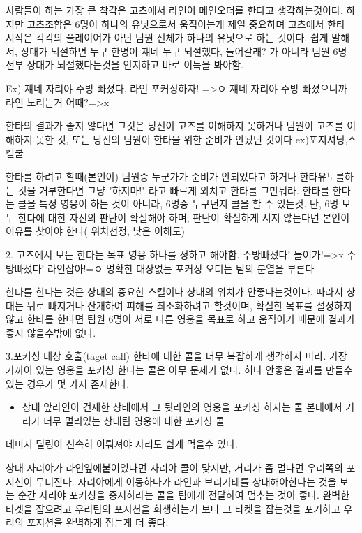  사람들이 하는 가장 큰 착각은 고츠에서 라인이 메인오더를 한다고 생각하는것이다.
하지만 고츠조합은 6명이 하나의 유닛으로서 움직이는게 제일 중요하며 고츠에서 한타 시작은 각각의 플레이어가 아닌 팀원 전체가 하나의 유닛으로 하는 것이다.
쉽게 말해서, 상대가 뇌절하면 누구 한명이 쟤네 누구 뇌절했다, 들어갈래? 가 아니라 팀원 6명 전부 상대가 뇌절했다는것을 인지하고 바로 이득을 봐야함.

Ex) 쟤네 자리야 주방 빠졌다, 라인 포커싱하자! =>ㅇ
     쟤네 자리야 주방 빠졌으니까 라인 노리는거 어때?=>x

 한타의 결과가 좋지 않다면 그것은 당신이 고츠를 이해하지 못하거나 팀원이 고츠를 이해하지 못한 것, 또는 당신의 팀원이 한타을 위한 준비가 안됬던 것이다 ex)포지셔닝,스킬쿨

 한타를 하려고 할때(본인이) 팀원중 누군가가 준비가 안되었다고 하거나 한타유도를하는 것을 거부한다면 그냥 "하지마!" 라고 빠르게 외치고 한타를 그만둬라.
한타를 한다는 콜을 특정 영웅이 하는 것이 아니라, 6명중 누구던지 콜을 할 수 있는것.
단, 6명 모두 한타에 대한 자신의 판단이 확실해야 하며, 판단이 확실하게 서지 않는다면 본인이 이유를 찾아야 한다( 위치선정, 낮은 이해도)

2. 고츠에서 모든 한타는 목표 영웅 하나를 정하고 해야함.
            주방빠졌다! 들어가!=>x
            주방빠졌다! 라인잡아!=ㅇ
명확한 대상없는 포커싱 오더는 팀의 분열을 부른다

 한타를 한다는 것은 상대의 중요한 스킬이나 상대의 위치가 안좋다는것이다. 
따라서 상대는 뒤로 빠지거나 산개하여 피해를 최소화하려고 할것이며,
확실한 목표를 설정하지 않고 한타를 한다면 팀원 6명이 서로 다른 영웅을 목표로 하고 움직이기 때문에 결과가 좋지 않을수밖에 없다.

3.포커싱 대상 호출(taget call)
 한타에 대한 콜을 너무 복잡하게 생각하지 마라.
가장 가까이 있는 영웅을 포커싱 한다는 콜은 아무 문제가 없다.  
허나 안좋은 결과를 만들수 있는 경우가 몇 가지 존재한다.
\begin{itemize}
    \item 상대 앞라인이 건재한 상태에서 그 뒷라인의 영웅을 포커싱 하자는 콜
     본대에서 거리가 너무 멀리있는 상대팀 영웅에 대한 포커싱 콜
\end{itemize}
데미지 딜링이 신속히 이뤄져야 자리도 쉽게 먹을수 있다.

상대 자리야가 라인옆에붙어있다면 자리야 콜이 맞지만, 거리가 좀 멀다면 우리쪽의 포지션이 무너진다.
자리야에게 이동하다가 라인과 브리기테를 상대해야한다는 것을 보는 순간 자리야 포커싱을 중지하라는 콜을 팀에게 전달하여 멈추는 것이 좋다.
완벽한 타겟을 잡으려고 우리팀의 포지션을 희생하는거 보다 그 타켓을 잡는것을 포기하고 우리의 포지션을 완벽하게 잡는게 더 좋다.


